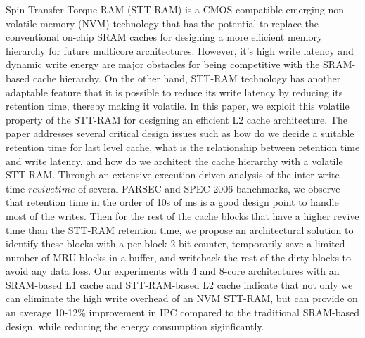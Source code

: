 
Spin-Transfer Torque RAM (STT-RAM) is a CMOS compatible emerging non-volatile memory (NVM) 
technology that has the potential to replace the conventional
on-chip SRAM caches for designing a more efficient memory hierarchy for
future multicore architectures. 
However, it's high write latency and dynamic
write energy are major obstacles for being competitive with the SRAM-based cache hierarchy.
On the other hand, STT-RAM technology has another adaptable feature that it is possible to reduce its write
latency by reducing its retention time, thereby making it volatile.
In this paper, we exploit this volatile property of the STT-RAM for designing an efficient L2 cache 
architecture. The paper addresses several critical design issues such as how do we decide a suitable retention time for last level cache,
what is the relationship between retention time and write latency,
and how do we architect the cache hierarchy with a volatile STT-RAM.
Through an extensive execution driven analysis of the inter-write time \(revive time\) of several PARSEC and SPEC 2006 banchmarks, we 
observe that retention time in the order of 10s of ms is a good design point to handle most of the
writes.  Then for the rest of the cache blocks that have a higher revive
time than the STT-RAM retention time, we propose an architectural solution to identify these blocks
with a per block 2 bit counter, temporarily save a limited number of MRU blocks in a buffer,
and writeback the rest of the dirty blocks to avoid any data loss.
Our experiments with 4 and 8-core architectures with an SRAM-based L1 cache and STT-RAM-based L2 cache 
indicate that not only we can eliminate the high write overhead of an NVM STT-RAM, but can provide
on an average 10-12\% improvement in IPC compared to the traditional SRAM-based
design, while reducing the energy consumption siginficantly. 

